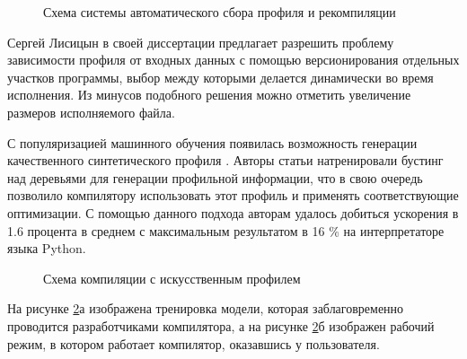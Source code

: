 \begin{figure}[ht]
	\caption{Схема системы автоматического сбора профиля и рекомпиляции \cite{chen2016autofdo}}\label{partReview:fdo2}
\end{figure}

Сергей Лисицын  в своей диссертации \cite{SergeyL1} предлагает разрешить проблему зависимости профиля от входных данных с помощью версионирования отдельных участков программы, выбор между которыми делается динамически во время исполнения. Из минусов подобного решения можно отметить увеличение размеров исполняемого файла.

С популяризацией машинного обучения появилась возможность генерации качественного синтетического профиля \cite{rotem2021profile}. Авторы статьи натренировали бустинг над деревьями для генерации профильной информации, что в свою очередь позволило компилятору использовать этот профиль и применять соответствующие оптимизации. С помощью данного подхода авторам удалось добиться ускорения в 1.6 процента в среднем с максимальным результатом в 16 \%  на интерпретаторе языка Python. 
 \begin{figure}[htbp]
	\centering
	
	\caption{Схема компиляции с искусственным профилем}
	\label{partReview:pgo_without profile}
\end{figure}
На рисунке \ref{partReview:pgo_without profile}а изображена тренировка модели, которая заблаговременно проводится разработчиками компилятора, а на рисунке \ref{partReview:pgo_without profile}б изображен рабочий режим, в котором работает компилятор, оказавшись у пользователя.

\FloatBarrier
